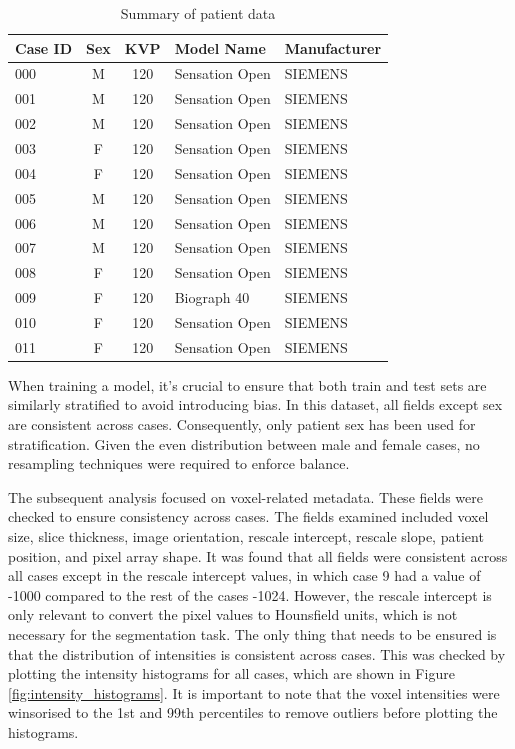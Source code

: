 \documentclass[11pt]{article}
\begin{document}
\begin{table}[h]
    \centering
    \begin{tabular}{|l|c|c|l|l|}
    \hline
    \textbf{Case ID} & \textbf{Sex} & \textbf{KVP} & \textbf{Model Name} & \textbf{Manufacturer} \\ \hline
    000 & M & 120 & Sensation Open & SIEMENS \\ \hline
    001 & M & 120 & Sensation Open & SIEMENS \\ \hline
    002 & M & 120 & Sensation Open & SIEMENS \\ \hline
    003 & F & 120 & Sensation Open & SIEMENS \\ \hline
    004 & F & 120 & Sensation Open & SIEMENS \\ \hline
    005 & M & 120 & Sensation Open & SIEMENS \\ \hline
    006 & M & 120 & Sensation Open & SIEMENS \\ \hline
    007 & M & 120 & Sensation Open & SIEMENS \\ \hline
    008 & F & 120 & Sensation Open & SIEMENS \\ \hline
    009 & F & 120 & Biograph 40 & SIEMENS \\ \hline
    010 & F & 120 & Sensation Open & SIEMENS \\ \hline
    011 & F & 120 & Sensation Open & SIEMENS \\ \hline
    \end{tabular}
    \caption{Summary of patient data}
    \label{tab:patient_meta}
\end{table}

When training a model, it's crucial to ensure that both train and test sets are similarly stratified to avoid introducing bias. In this dataset, all fields except sex are consistent across cases. Consequently, only patient sex has been used for stratification. Given the even distribution between male and female cases, no resampling techniques were required to enforce balance.

The subsequent analysis focused on voxel-related metadata. These fields were checked to ensure consistency across cases. The fields examined included voxel size, slice thickness, image orientation, rescale intercept, rescale slope, patient position, and pixel array shape. It was found that all fields were consistent across all cases except in the rescale intercept values, in which case 9 had a value of -1000 compared to the rest of the cases -1024. However, the rescale intercept is only relevant to convert the pixel values to Hounsfield units, which is not necessary for the segmentation task. The only thing that needs to be ensured is that the distribution of intensities is consistent across cases. This was checked by plotting the intensity histograms for all cases, which are shown in Figure \ref{fig:intensity_histograms}. It is important to note that the voxel intensities were winsorised to the 1st and 99th percentiles to remove outliers before plotting the histograms.
\end{document}
